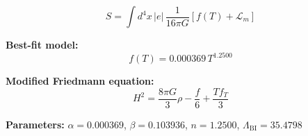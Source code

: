 
\begin{equation}
  S = \int d^4x \, |e| \, \frac{1}{16\pi G} \left[ f(T) + \mathcal{L}_m \right]
\end{equation}

\textbf{Best-fit model:}
\begin{equation}
  f(T) = 0.000369 \, T^{1.2500}
\end{equation}

\textbf{Modified Friedmann equation:}
\begin{equation}
  H^2 = \frac{8\pi G}{3} \rho - \frac{f}{6} + \frac{T f_T}{3}
\end{equation}

\textbf{Parameters:}
$\alpha = 0.000369$, \quad
$\beta = 0.103936$, \quad
$n = 1.2500$, \quad
$\Lambda_{\text{BI}} = 35.4798$